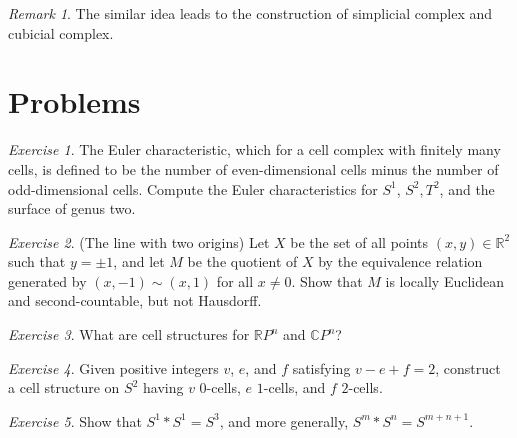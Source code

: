 \documentclass{article}
\theoremstyle{definition}
\theoremstyle{remark}
\newtheorem*{remark}{Remark}
\newtheorem{exercise}{Exercise}
\begin{document}
\begin{remark}
The similar idea leads to the construction of simplicial complex and cubicial complex.  
\end{remark}

\section{Problems}
\begin{exercise}
The Euler characteristic, which for a cell complex with finitely many cells, is defined to be the number of even-dimensional cells minus the number of odd-dimensional cells. Compute the Euler characteristics for $S^{1}$, $S^{2}, T^{2}$, and the surface of genus two. 
\end{exercise}

\begin{exercise}(The line with two origins)
Let $X$ be the set of all points $(x, y) \in \mathbb{R}^{2}$ such that $y = \pm{1}$, and let $M$ be the quotient of $X$ by the equivalence relation generated by $(x, -1) \sim (x, 1)$ for all $x \neq 0$. Show that $M$ is locally Euclidean and second-countable, but not Hausdorff. 
\end{exercise}

\begin{exercise}
What are cell structures for $\mathbb{R}P^{n}$ and $\mathbb{C}P^{n}$? 
\end{exercise}

\begin{exercise}
Given positive integers $v$, $e$, and $f$ satisfying $v - e + f = 2$, construct a cell structure on $S^{2}$ having $v$ $0$-cells, $e$ $1$-cells, and $f$ $2$-cells. 
\end{exercise}

\begin{exercise}
Show that $S^{1} * S^{1} = S^{3}$, and more generally, $S^{m} * S^{n} = S^{m + n + 1}$. 
\end{exercise}
\end{document}

